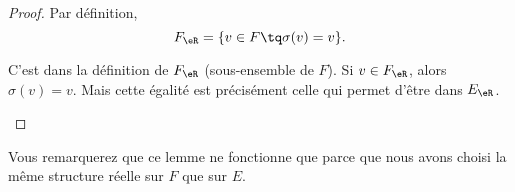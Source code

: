 \begin{proof}
	Par définition,
	\begin{equation}
		F_{\eR}=\{ v\in F\tq \sigma(v)=v \}.
	\end{equation}
	\begin{subproof}
		\spitem[\( F_{\eR}\subset F\)]
		C'est dans la définition de \( F_{\eR}\) (sous-ensemble de \( F\)).
		\spitem[\( F_{\eR}\subset E_{\eR}\)]
		Si \( v\in F_\eR\), alors \( \sigma(v)=v\). Mais cette égalité est précisément celle qui permet d'être dans \( E_{\eR}\).
	\end{subproof}
\end{proof}

Vous remarquerez que ce lemme ne fonctionne que parce que nous avons choisi la même structure réelle sur \( F\) que sur \( E\).
